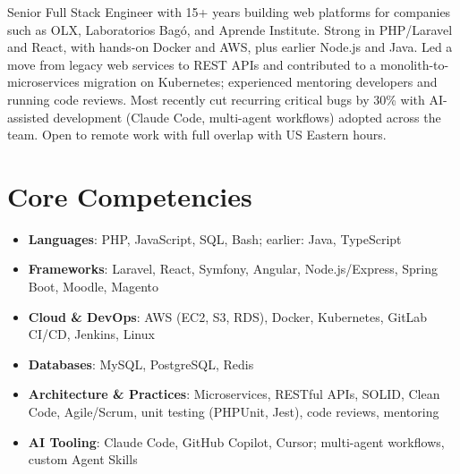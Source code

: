 \documentclass[11pt,a4paper,sans]{moderncv}
\begin{document}
\makecvtitle


\vspace{6pt}
\small{Senior Full Stack Engineer with 15+ years building web platforms for companies such as OLX, Laboratorios Bag\'o, and Aprende Institute. Strong in PHP/Laravel and React, with hands-on Docker and AWS, plus earlier Node.js and Java. Led a move from legacy web services to REST APIs and contributed to a monolith-to-microservices migration on Kubernetes; experienced mentoring developers and running code reviews. Most recently cut recurring critical bugs by 30\% with AI-assisted development (Claude Code, multi-agent workflows) adopted across the team. Open to remote work with full overlap with US Eastern hours.}


\section{Core Competencies}
\vspace{1pt}
\begin{itemize}
\item \textbf{Languages}: PHP, JavaScript, SQL, Bash; earlier: Java, TypeScript
\item \textbf{Frameworks}: Laravel, React, Symfony, Angular, Node.js/Express, Spring Boot, Moodle, Magento
\item \textbf{Cloud \& DevOps}: AWS (EC2, S3, RDS), Docker, Kubernetes, GitLab CI/CD, Jenkins, Linux
\item \textbf{Databases}: MySQL, PostgreSQL, Redis
\item \textbf{Architecture \& Practices}: Microservices, RESTful APIs, SOLID, Clean Code, Agile/Scrum, unit testing (PHPUnit, Jest), code reviews, mentoring
\item \textbf{AI Tooling}: Claude Code, GitHub Copilot, Cursor; multi-agent workflows, custom Agent Skills
\end{itemize}

\end{document}
